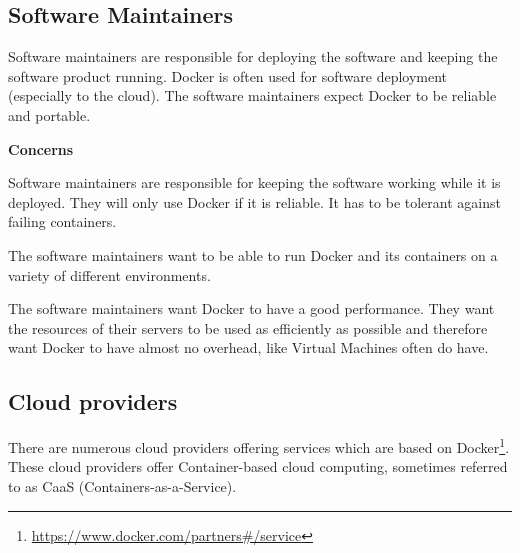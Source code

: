 \subsection*{Software Maintainers}
Software maintainers are responsible for deploying the software and keeping the software product running. Docker is often used for software deployment (especially to the cloud). %
The software maintainers expect Docker to be reliable and portable.

\textbf{Concerns}
\begin{description}[labelwidth=6cm,labelindent=30pt,style=multiline,leftmargin=5.5cm,font=\normalfont\itshape]


\item[\textbf{Reliability}] Software maintainers are responsible for keeping the software working while it is deployed. They will only use Docker if it is reliable. It has to be tolerant against failing containers.

\item[\textbf{Portability}] The software maintainers want to be able to run Docker and its containers on a variety of different environments.

\item[\textbf{Performance efficiency}] The software maintainers want Docker to have a good performance. They want the resources of their servers to be used as efficiently as possible and therefore want Docker to have almost no overhead, like Virtual Machines often do have.

\end{description}



\subsection*{Cloud providers}
There are numerous cloud providers offering services which are based on Docker\footnote{\url{https://www.docker.com/partners\#/service}}. These cloud providers offer Container-based cloud computing, sometimes referred to as CaaS (Containers-as-a-Service).


